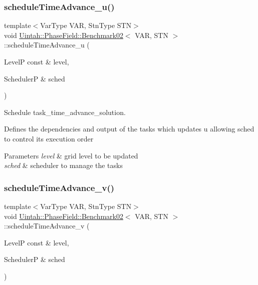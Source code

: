 \subsubsection{\texorpdfstring{schedule\+Time\+Advance\+\_\+u()}{scheduleTimeAdvance\_u()}}
{\footnotesize\ttfamily template$<$Var\+Type V\+AR, Stn\+Type S\+TN$>$ \\
void \hyperlink{classUintah_1_1PhaseField_1_1Benchmark02}{Uintah\+::\+Phase\+Field\+::\+Benchmark02}$<$ V\+AR, S\+TN $>$\+::schedule\+Time\+Advance\+\_\+u (\begin{DoxyParamCaption}\item[{LevelP const \&}]{level,  }\item[{SchedulerP \&}]{sched }\end{DoxyParamCaption})\hspace{0.3cm}{\ttfamily [protected]}}



Schedule task\+\_\+time\+\_\+advance\+\_\+solution. 

Defines the dependencies and output of the tasks which updates u allowing sched to control its execution order


\begin{DoxyParams}{Parameters}
{\em level} & grid level to be updated \\
\hline
{\em sched} & scheduler to manage the tasks \\
\hline
\end{DoxyParams}
\mbox{\label{classUintah_1_1PhaseField_1_1Benchmark02_a73521864cb1e605a4c4e723b50773a67}} 
\subsubsection{\texorpdfstring{schedule\+Time\+Advance\+\_\+v()}{scheduleTimeAdvance\_v()}}
{\footnotesize\ttfamily template$<$Var\+Type V\+AR, Stn\+Type S\+TN$>$ \\
void \hyperlink{classUintah_1_1PhaseField_1_1Benchmark02}{Uintah\+::\+Phase\+Field\+::\+Benchmark02}$<$ V\+AR, S\+TN $>$\+::schedule\+Time\+Advance\+\_\+v (\begin{DoxyParamCaption}\item[{LevelP const \&}]{level,  }\item[{SchedulerP \&}]{sched }\end{DoxyParamCaption})\hspace{0.3cm}{\ttfamily [protected]}}



